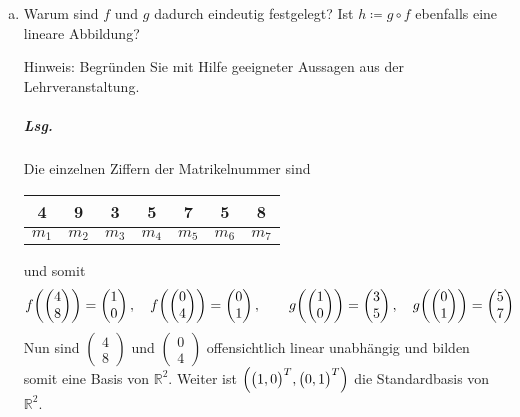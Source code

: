 \documentclass{scrreprt}
\begin{document}
\begin{enumerate}[(a)]
\item Warum sind $f$ und $g$ dadurch eindeutig festgelegt?
  Ist $h \coloneqq g \circ f$ ebenfalls eine lineare Abbildung?

  \begin{small}
    Hinweis: Begründen Sie mit Hilfe geeigneter Aussagen aus der
    Lehrveranstaltung.
  \end{small}

  \subparagraph{Lsg.} Die einzelnen Ziffern der Matrikelnummer sind

  \begin{tabular}{|c|c|c|c|c|c|c|}
    \hline
    4 & 9 & 3 & 5 & 7 & 5 & 8 \\
    \hline
    $m_1$ & $m_2$ & $m_3$ & $m_4$ & $m_5$ & $m_6$ & $m_7$ \\
    \hline
  \end{tabular}

  und somit
  \[
    f\qty(\begin{pmatrix} 4 \\ 8 \end{pmatrix})
    = \begin{pmatrix} 1 \\ 0 \end{pmatrix}, \quad
    f\qty(\begin{pmatrix} 0 \\ 4 \end{pmatrix})
    = \begin{pmatrix} 0 \\ 1 \end{pmatrix}, \qquad
    g\qty(\begin{pmatrix} 1 \\ 0 \end{pmatrix})
    = \begin{pmatrix} 3 \\ 5 \end{pmatrix}, \quad
    g\qty(\begin{pmatrix} 0 \\ 1 \end{pmatrix})
    = \begin{pmatrix} 5 \\ 7 \end{pmatrix}
  \]
  Nun sind $\begin{pmatrix} 4 \\ 8 \end{pmatrix}$ und
  $\begin{pmatrix} 0 \\ 4 \end{pmatrix}$ offensichtlich linear unabhängig und
  bilden somit eine Basis von $\mathbb{R}^2$.
  Weiter ist $\qty(\qty\big(1, 0)^T, \qty\big(0, 1)^T)$ die Standardbasis von
  $\mathbb{R}^2$.


\end{enumerate}
\end{document}
